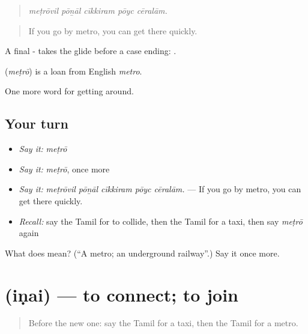 \begin{quote}
\emph{meṭrōvil pōṉāl cīkkiram pōyc cēralām.}
\end{quote}

\begin{quote}
If you go by metro, you can get there quickly.
\end{quote}

A final - takes the glide  before a case ending: .

\begin{cousinweb}
\textbf{} (\emph{meṭrō}) is a loan from English \emph{metro}.
\end{cousinweb}

\begin{grammarlens}[title={What you've built}]
One more word for getting around.
\end{grammarlens}

\subsection*{Your turn}
\begin{itemize}
\raggedright
  \item \emph{Say it:} \emph{meṭrō}
  \item \emph{Say it:} \emph{meṭrō}, once more
  \item \emph{Say it:} \emph{meṭrōvil pōṉāl cīkkiram pōyc cēralām.} — If you go by metro, you can get there quickly.
  \item \emph{Recall:} say the Tamil for to collide, then the Tamil for a taxi, then say \emph{meṭrō} again
\end{itemize}

\begin{tcolorbox}[breakable,colback=teal!4,colframe=teal!35!black,title={Before you move on}]
What does  mean? (\textquotedblleft{}A metro; an underground railway\textquotedblright{}.) Say it once more.
\end{tcolorbox}
\section[\texorpdfstring{\ta{இணை} (iṇai)}{இணை (iṇai)}]{ (iṇai) — to connect; to join}

\label{lesson:TA-C405-inai}



\begin{quote}
Before the new one: say the Tamil for a taxi, then the Tamil for a metro.
\end{quote}

